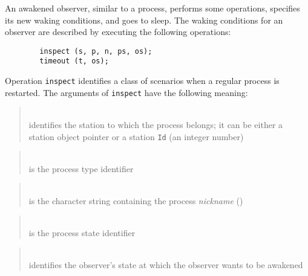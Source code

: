 An awakened observer, similar to a process, performs some
operations, specifies its new waking conditions, and goes to sleep.
The waking conditions for an observer are described by executing
the following operations:
\begin{verbatim}
        inspect (s, p, n, ps, os);
        timeout (t, os);
\end{verbatim}

Operation {\tt inspect} identifies a class of scenarios when a regular process
is restarted.
The arguments of {\tt inspect} have the following meaning:

\medskip

\begin{quote}
\noindent{}\\ \hspace{0in}
identifies the station to which the process belongs;
it can be either a station object pointer or a station {\tt Id} (an integer
number)
\end{quote}

\begin{quote}
\noindent{}\\ \hspace{0in}
is the process type identifier
\end{quote}

\begin{quote}
\noindent{}\\ \hspace{0in}
is the character string containing the process {\em nickname}
()
\end{quote}

\begin{quote}
\noindent{}\\ \hspace{0in}
is the process state identifier
\end{quote}

\begin{quote}
\noindent{}\\ \hspace{0in}
identifies the observer's state at which the observer wants to be awakened
\end{quote}\medskip

